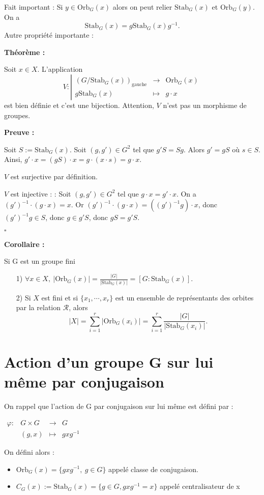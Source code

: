 \documentclass{report}
\renewenvironment{leftbar}{%
  \def\FrameCommand{\vrule width 0.4pt \hspace{10pt}}%
  \MakeFramed {\advance\hsize-\width \FrameRestore}}%
 {\endMakeFramed}%
\newenvironment{preuve}{\vspace*{0.5cm}
    \begin{leftbar}
    \noindent\textbf{Preuve :}\par}{
    \begin{flushright}
    $\square$
    \end{flushright}
    \end{leftbar}
}
\newenvironment{corollaire}{\begin{tcolorbox}[colframe= white]
    \textbf{Corollaire :} \par}
    {\end{tcolorbox}}
\newenvironment{theoreme}[1][]{
    \begin{tcolorbox}[]
    \textbf{Théorème :} #1  \par} 
    {\end{tcolorbox}}
\newcommand{\fonction}[5]{
    \begin{array}{l|rcl}
    #1: & #2 & \longrightarrow & #3 \\
        & #4 & \longmapsto & #5 
    \end{array}
}
\newcommand{\dsp}{\displaystyle}
\newcommand{\orb}{\text{Orb}}
\newcommand{\stab}{\text{Stab}}
\newcommand{\mc}{\mathcal}
\newcommand{\D}{\right}
\newcommand{\G}{\left}
\newcommand{\fonctions}[5]{\begin{displaymath}#1:\left| \begin{array}{ccc}
 #2 & \longrightarrow & #3 \\
    #4 & \longmapsto & #5 \end{array}\right.\end{displaymath}}
\begin{document}
\par
Fait important : Si $y\in\text{Orb}_G(x)$ alors on peut relier $\text{Stab}_G(x)$ et $\text{Orb}_G(y)$. On a 
$$\text{Stab}_G(x)=g\text{Stab}_G(x)g^{-1}.$$
Autre propriété importante :
\par
\begin{theoreme}
Soit $x\in X$. L’application 
\fonctions{V}{(G/\text{Stab}_G(x))_{\text{gauche}}}{\text{Orb}_G(x)}{g\text{Stab}_G(x)}{g\cdot x}
est bien définie et c’est une bijection. Attention, $V$ n’est pas un morphisme de groupes. 
\end{theoreme}
\par
\begin{preuve}
Soit $S:=\text{Stab}_G(x)$. Soit $(g,g')\in G^2$ tel que $g'S=Sg$. Alors $g'=gS$ où $s\in S$. Ainsi, $g'\cdot x=(gS)\cdot x=g\cdot (x\cdot s)=g\cdot x$.
\par
$V$ est surjective par définition. 
\par
$V$ est injective : : Soit $(g,g')\in G^2$ tel que $g\cdot x=g'\cdot x$. On a $(g')^{-1}\cdot (g\cdot x)=x$. Or $(g')^{-1}\cdot (g\cdot x)=((g')^{-1}g)\cdot x$, donc $(g')^{-1}g\in S$, donc $g\in g'S$, donc $gS=g'S$.  
\end{preuve}
\par
\begin{corollaire} Si G est un groupe fini
\begin{itemize}
\item[1)] $\forall x\in X,\ \G|\text{Orb}_G(x)\D|=\frac{|G|}{|\text{Stab}_G(x)|}=[G:\text{Stab}_G(x)]$. 
\item[2)] Si $X$ est fini et si $\{x_1,\cdots,x_r\}$ est un ensemble de représentants des orbites par la relation $\mc{R}$, alors 
$$|X|=\sum_{i=1}^{r}|\text{Orb}_G(x_i)|= \sum_{i=1}^{r}\frac{|G|}{|\text{Stab}_G(x_i)|}.$$
\end{itemize}
\end{corollaire}

\section{Action d'un groupe G sur lui même par conjugaison}

On rappel que l'action de G par conjugaison sur lui même est défini par :\par
\begin{center}$
\fonction{\varphi}{G\times G}{G}{(g,x)}{gxg^{-1}}$
\end{center}
On défini alors :
\begin{itemize}
\item $\dsp \orb_G(x) = \{ gxg^{-1},~ g\in G \}$ appelé classe de conjugaison.
 \item $\dsp C_{G}(x):=\stab_G(x) = \{g\in G, gxg^{-1}=x\}$ appelé centralisateur de x
\end{itemize}
\end{document}
